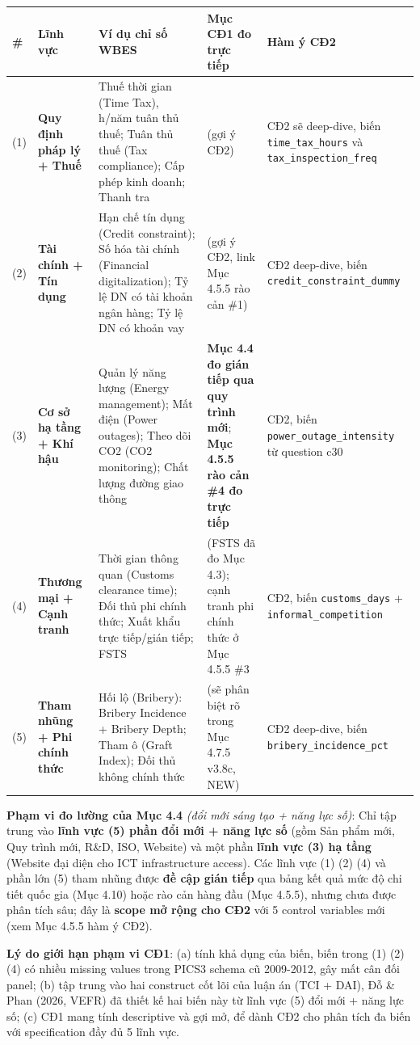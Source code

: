 \documentclass[12pt,a4paper]{article}
\begin{document}
\begin{longtable}[]{@{}lllll@{}}
\toprule\noalign{}
\# & Lĩnh vực & Ví dụ chỉ số WBES & Mục CĐ1 đo trực tiếp & Hàm ý CĐ2 \\
\midrule\noalign{}
\endhead
\bottomrule\noalign{}
\endlastfoot
(1) & \textbf{Quy định pháp lý + Thuế} & Thuế thời gian (Time Tax),
h/năm tuân thủ thuế; Tuân thủ thuế (Tax compliance); Cấp phép kinh
doanh; Thanh tra & (gợi ý CĐ2) & CĐ2 sẽ deep-dive, biến
\texttt{time\_tax\_hours} và \texttt{tax\_inspection\_freq} \\
(2) & \textbf{Tài chính + Tín dụng} & Hạn chế tín dụng (Credit
constraint); Số hóa tài chính (Financial digitalization); Tỷ lệ DN có
tài khoản ngân hàng; Tỷ lệ DN có khoản vay & (gợi ý CĐ2, link Mục 4.5.5
rào cản \#1) & CĐ2 deep-dive, biến \texttt{credit\_constraint\_dummy} \\
(3) & \textbf{Cơ sở hạ tầng + Khí hậu} & Quản lý năng lượng (Energy
management); Mất điện (Power outages); Theo dõi CO2 (CO2 monitoring);
Chất lượng đường giao thông & \textbf{Mục 4.4 đo gián tiếp qua quy trình
mới}; \textbf{Mục 4.5.5 rào cản \#4 đo trực tiếp} & CĐ2, biến
\texttt{power\_outage\_intensity} từ question c30 \\
(4) & \textbf{Thương mại + Cạnh tranh} & Thời gian thông quan (Customs
clearance time); Đối thủ phi chính thức; Xuất khẩu trực tiếp/gián tiếp;
FSTS & (FSTS đã đo Mục 4.3); cạnh tranh phi chính thức ở Mục 4.5.5 \#3 &
CĐ2, biến \texttt{customs\_days} + \texttt{informal\_competition} \\
(5) & \textbf{Tham nhũng + Phi chính thức} & Hối lộ (Bribery): Bribery
Incidence + Bribery Depth; Tham ô (Graft Index); Đối thủ không chính
thức & (sẽ phân biệt rõ trong Mục 4.7.5 v3.8c, NEW) & CĐ2 deep-dive,
biến \texttt{bribery\_incidence\_pct} \\
\end{longtable}

\textbf{Phạm vi đo lường của Mục 4.4} \emph{(đổi mới sáng tạo + năng lực
số)}: Chỉ tập trung vào \textbf{lĩnh vực (5) phần đổi mới + năng lực số}
(gồm Sản phẩm mới, Quy trình mới, R\&D, ISO, Website) và một phần
\textbf{lĩnh vực (3) hạ tầng} (Website đại diện cho ICT infrastructure
access). Các lĩnh vực (1) (2) (4) và phần lớn (5) tham nhũng được
\textbf{đề cập gián tiếp} qua bảng kết quả mức độ chi tiết quốc gia (Mục
4.10) hoặc rào cản hàng đầu (Mục 4.5.5), nhưng chưa được phân tích sâu;
đây là \textbf{scope mở rộng cho CĐ2} với 5 control variables mới (xem
Mục 4.5.5 hàm ý CĐ2).

\textbf{Lý do giới hạn phạm vi CĐ1}: (a) tính khả dụng của biến, biến
trong (1) (2) (4) có nhiều missing values trong PICS3 schema cũ
2009-2012, gây mất cân đối panel; (b) tập trung vào hai construct cốt
lõi của luận án (TCI + DAI), Đỗ \& Phan (2026, VEFR) đã thiết kế hai
biến này từ lĩnh vực (5) đổi mới + năng lực số; (c) CĐ1 mang tính
descriptive và gợi mở, để dành CĐ2 cho phân tích đa biến với
specification đầy đủ 5 lĩnh vực.
\end{document}
